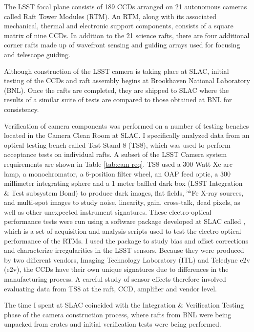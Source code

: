 The LSST focal plane consists of 189 CCDs arranged on 21 autonomous cameras called Raft Tower Modules (RTM). An RTM, along with its associated mechanical, thermal and electronic support components, consists of a square matrix of nine CCDs. In addition to the 21 science rafts, there are four additional corner rafts made up of wavefront sensing and guiding arrays used for focusing and telescope guiding.

Although construction of the LSST camera is taking place at SLAC, initial testing of the CCDs and raft assembly begins at Brookhaven National Laboratory (BNL). Once the rafts are completed, they are shipped to SLAC where the results of a similar suite of tests are compared to those obtained at BNL for consistency.

Verification of camera components was performed on a number of testing benches located in the Camera Clean Room at SLAC. I specifically analyzed data from an optical testing bench called Test Stand 8 (TS8), which was used to perform acceptance tests on individual rafts. A subset of the LSST Camera system requirements are shown in Table \ref{tab:cam-req}. TS8 used a 300 Watt Xe arc lamp, a monochromator, a 6-position filter wheel, an OAP feed optic, a 300 millimeter integrating sphere and a 1 meter baffled dark box (LSST Integration & Test subsystem Bond) to produce dark images, flat fields, $^{55}$Fe X-ray sources, and multi-spot images to study noise, linearity, gain, cross-talk, dead pixels, as well as other unexpected instrument signatures. These electro-optical performance tests were run using a software package developed at SLAC called , which is a set of acquisition and analysis scripts used to test the electro-optical performance of the RTMs.  I used the  package to study bias and offset corrections and characterize irregularities in the LSST sensors. Because they were produced by two different vendors, Imaging Technology Laboratory (ITL) and Teledyne e2v (e2v), the CCDs have their own unique signatures due to differences in the manufacturing process. A careful study of sensor effects therefore involved evaluating data from TS8 at the raft, CCD, amplifier and vendor level.

The time I spent at SLAC coincided with the Integration \& Verification Testing phase of the camera construction process, where rafts from BNL were being unpacked from crates and initial verification tests were being performed. 

